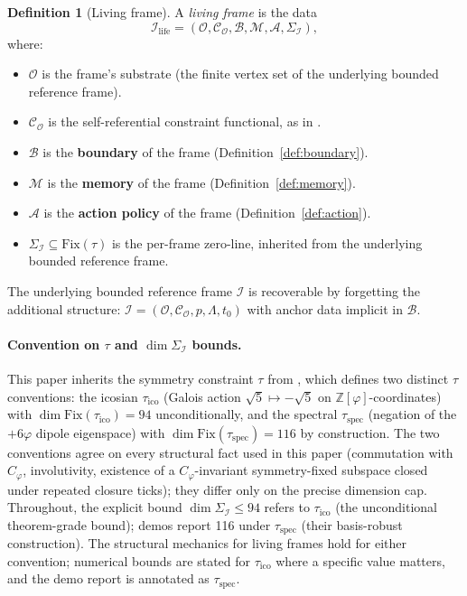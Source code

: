 \documentclass[11pt]{article}
\theoremstyle{plain}
\theoremstyle{definition}
\newtheorem{definition}[theorem]{Definition}
\theoremstyle{remark}
\newcommand{\Zphi}{\mathbb{Z}[\varphi]}
\newcommand{\Fix}{\mathrm{Fix}}
\newcommand{\Ical}{\mathcal{I}}
\newcommand{\Ocal}{\mathcal{O}}
\newcommand{\Ccal}{\mathcal{C}}
\newcommand{\Mcal}{\mathcal{M}}
\newcommand{\Acal}{\mathcal{A}}
\newcommand{\Bcal}{\mathcal{B}}
\newcommand{\Cph}{C_\varphi}
\newcommand{\Ilife}{\Ical_{\mathrm{life}}}
\begin{document}
\begin{definition}[Living frame]\label{def:living-frame}
A \emph{living frame} is the data
\[
  \Ilife = (\Ocal, \Ccal_\Ocal, \Bcal, \Mcal, \Acal, \Sigma_\Ical),
\]
where:
\begin{itemize}[leftmargin=2em]
\item $\Ocal$ is the frame's substrate (the finite vertex set of the underlying bounded reference frame).
\item $\Ccal_\Ocal$ is the self-referential constraint functional, as in \citet{SmartExistenceClosure}.
\item $\Bcal$ is the \textbf{boundary} of the frame (Definition~\ref{def:boundary}).
\item $\Mcal$ is the \textbf{memory} of the frame (Definition~\ref{def:memory}).
\item $\Acal$ is the \textbf{action policy} of the frame (Definition~\ref{def:action}).
\item $\Sigma_\Ical \subseteq \Fix(\tau)$ is the per-frame zero-line, inherited from the underlying bounded reference frame.
\end{itemize}
The underlying bounded reference frame $\Ical$ is recoverable by forgetting the additional structure: $\Ical = (\Ocal, \Ccal_\Ocal, p, \Lambda, t_0)$ with anchor data implicit in $\Bcal$.
\end{definition}

\paragraph{Convention on $\tau$ and $\dim \Sigma_\Ical$ bounds.} This paper inherits the symmetry constraint $\tau$ from \citet{SmartExistenceClosure}, which defines two distinct $\tau$ conventions: the icosian $\tau_{\mathrm{ico}}$ (Galois action $\sqrt 5 \mapsto -\sqrt 5$ on $\Zphi$-coordinates) with $\dim \Fix(\tau_{\mathrm{ico}}) = 94$ unconditionally, and the spectral $\tau_{\mathrm{spec}}$ (negation of the $+6\varphi$ dipole eigenspace) with $\dim \Fix(\tau_{\mathrm{spec}}) = 116$ by construction. The two conventions agree on every structural fact used in this paper (commutation with $\Cph$, involutivity, existence of a $\Cph$-invariant symmetry-fixed subspace closed under repeated closure ticks); they differ only on the precise dimension cap. Throughout, the explicit bound $\dim \Sigma_\Ical \leq 94$ refers to $\tau_{\mathrm{ico}}$ (the unconditional theorem-grade bound); demos report 116 under $\tau_{\mathrm{spec}}$ (their basis-robust construction). The structural mechanics for living frames hold for either convention; numerical bounds are stated for $\tau_{\mathrm{ico}}$ where a specific value matters, and the demo report is annotated as $\tau_{\mathrm{spec}}$.
\end{document}
